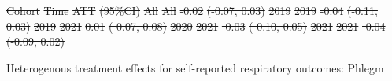 \documentclass[
  letterpaper,
  DIV=11,
  numbers=noendperiod]{scrartcl}
\makeatletter
\renewenvironment{table}%
   {\renewcommand\familydefault\sfdefault
    \@float{table}}
   {\end@float}
\providecommand{\DIFdel}[1]{{\protect\color{red}\sout{#1}}}                      %
\providecommand{\DIFdelFL}[1]{\DIFdel{#1}} %
\makeatother
\begin{document}
\DIFdelFL{Cohort }%
\DIFdelFL{Time }%
\DIFdelFL{ATT }%
\DIFdelFL{(95\%CI)}%
\DIFdelFL{All }%
\DIFdelFL{All }%
\DIFdelFL{-0.02 }%
\DIFdelFL{(-0.07, 0.03)}%
\DIFdelFL{2019 }%
\DIFdelFL{2019 }%
\DIFdelFL{-0.04 }%
\DIFdelFL{(-0.11, 0.03)}%
\DIFdelFL{2019 }%
\DIFdelFL{2021 }%
\DIFdelFL{0.01 }%
\DIFdelFL{(-0.07, 0.08)}%
\DIFdelFL{2020 }%
\DIFdelFL{2021 }%
\DIFdelFL{-0.03 }%
\DIFdelFL{(-0.10, 0.05)}%
\DIFdelFL{2021 }%
\DIFdelFL{2021 }%
\DIFdelFL{-0.04 }%
\DIFdelFL{(-0.09, 0.02)}%

{%
\DIFdelFL{Heterogenous treatment effects for self-reported respiratory outcomes:
Phlegm }}%
\end{document}
